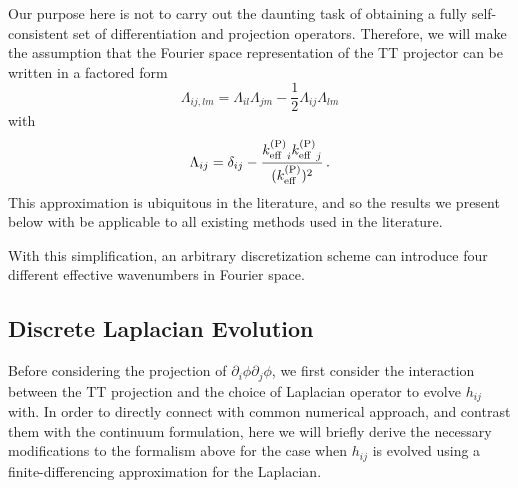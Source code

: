 \documentclass{revtex4}
\begin{document}
Our purpose here is not to carry out the daunting task of obtaining a fully self-consistent set of differentiation and projection operators.
Therefore, we will make the assumption that the Fourier space representation of the TT projector can be written in a factored form
\begin{equation}
  \Lambda_{ij,lm} = \Lambda_{il}\Lambda_{jm} - \frac{1}{2}\Lambda_{ij}\Lambda_{lm}
\end{equation}
with
\begin{equation}
  \Lambda_{ij} = \delta_{ij} - \frac{{k_{\rm eff}^{{\rm (P)}}}_i{k_{\rm eff}^{{\rm (P)}}}_j}{(k_{\rm eff}^{{\rm (P)}})^2} \, .
\end{equation}
This approximation is ubiquitous in the literature, and so the results we present below with be applicable to all existing methods used in the literature.


With this simplification, an arbitrary discretization scheme can introduce four different effective wavenumbers in Fourier space.

\subsection{Discrete Laplacian Evolution}
Before considering the projection of $\partial_i\phi\partial_j\phi$, we first consider the interaction between the TT projection and the choice of Laplacian operator to evolve $h_{ij}$ with.
In order to directly connect with common numerical approach, and contrast them with the continuum formulation, here we will briefly derive the necessary modifications to the formalism above for the case when $h_{ij}$ is evolved using a finite-differencing approximation for the Laplacian.
\end{document}
